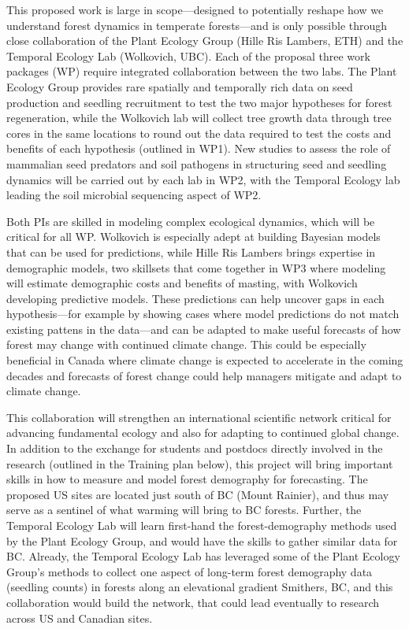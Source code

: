 \documentclass[11pt]{article}
\begin{document}
This proposed work is large in scope---designed to potentially reshape how we understand forest dynamics in temperate forests---and is only possible through close collaboration of the Plant Ecology Group (Hille Ris Lambers, ETH) and the Temporal Ecology Lab (Wolkovich, UBC). Each of the proposal three work packages (WP) require integrated collaboration between the two labs. The Plant Ecology Group provides rare spatially and temporally rich data on seed production and seedling recruitment to test the two major hypotheses for forest regeneration, while the Wolkovich lab will collect tree growth data through tree cores in the same locations to round out the data required to test the costs and benefits of each hypothesis (outlined in WP1). New studies to assess the role of mammalian seed predators and soil pathogens in structuring seed and seedling dynamics will be carried out by each lab in WP2, with the Temporal Ecology lab leading the soil microbial sequencing aspect of WP2. 

Both PIs are skilled in modeling complex ecological dynamics, which will be critical for all WP. Wolkovich is especially adept at building Bayesian models that can be used for predictions, while Hille Ris Lambers brings expertise in demographic models, two skillsets that come together in WP3 where modeling will estimate demographic costs and benefits of masting, with Wolkovich developing predictive models. These predictions can help uncover gaps in each hypothesis---for example by showing cases where model predictions do not match existing pattens in the data---and can be adapted to make useful forecasts of how forest may change with continued climate change. This could be especially beneficial in Canada where climate change is expected to accelerate in the coming decades and forecasts of forest change could help managers mitigate and adapt to climate change. 

This collaboration will strengthen an international scientific network critical for advancing fundamental ecology and also for adapting to continued global change. In addition to the exchange for students and postdocs directly involved in the research (outlined in the Training plan below), this project will bring important skills in how to measure and model forest demography for forecasting. The proposed US sites are located just south of BC (Mount Rainier), and thus may serve as a sentinel of what warming will bring to BC forests. Further, the Temporal Ecology Lab will learn first-hand the forest-demography methods used by the Plant Ecology Group, and would have the skills to gather similar data for BC. Already, the Temporal Ecology Lab has leveraged some of the Plant Ecology Group's methods to collect one aspect of long-term forest demography data (seedling counts) in forests along an elevational gradient Smithers, BC, and this collaboration would build the network, that could lead eventually to research across US and Canadian sites.  
\end{document}

